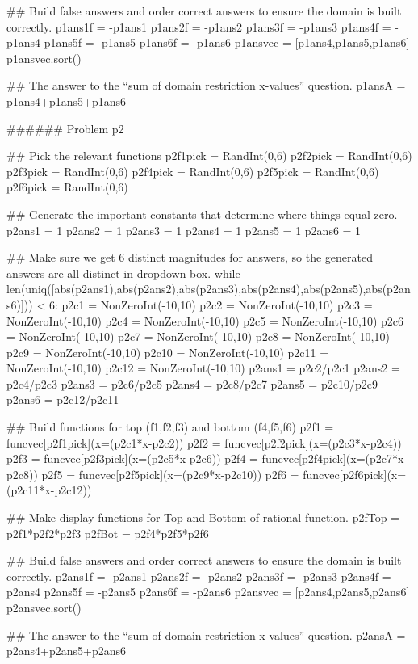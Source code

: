 \documentclass{ximera}
\begin{document}
\begin{sagesilent}
## Build false answers and order correct answers to ensure the domain is built correctly.
p1ans1f = -p1ans1
p1ans2f = -p1ans2
p1ans3f = -p1ans3
p1ans4f = -p1ans4
p1ans5f = -p1ans5
p1ans6f = -p1ans6
p1ansvec = [p1ans4,p1ans5,p1ans6]
p1ansvec.sort()

## The answer to the ``sum of domain restriction x-values'' question.
p1ansA = p1ans4+p1ans5+p1ans6



###### Problem p2

## Pick the relevant functions
p2f1pick = RandInt(0,6)
p2f2pick = RandInt(0,6)
p2f3pick = RandInt(0,6)
p2f4pick = RandInt(0,6)
p2f5pick = RandInt(0,6)
p2f6pick = RandInt(0,6)

## Generate the important constants that determine where things equal zero.
p2ans1 = 1
p2ans2 = 1
p2ans3 = 1
p2ans4 = 1
p2ans5 = 1
p2ans6 = 1

## Make sure we get 6 distinct magnitudes for answers, so the generated answers are all distinct in dropdown box.
while len(uniq([abs(p2ans1),abs(p2ans2),abs(p2ans3),abs(p2ans4),abs(p2ans5),abs(p2ans6)])) < 6:
    p2c1 = NonZeroInt(-10,10)
    p2c2 = NonZeroInt(-10,10)
    p2c3 = NonZeroInt(-10,10)
    p2c4 = NonZeroInt(-10,10)
    p2c5 = NonZeroInt(-10,10)
    p2c6 = NonZeroInt(-10,10)
    p2c7 = NonZeroInt(-10,10)
    p2c8 = NonZeroInt(-10,10)
    p2c9 = NonZeroInt(-10,10)
    p2c10 = NonZeroInt(-10,10)
    p2c11 = NonZeroInt(-10,10)
    p2c12 = NonZeroInt(-10,10)
    p2ans1 = p2c2/p2c1
    p2ans2 = p2c4/p2c3
    p2ans3 = p2c6/p2c5
    p2ans4 = p2c8/p2c7
    p2ans5 = p2c10/p2c9
    p2ans6 = p2c12/p2c11

## Build functions for top (f1,f2,f3) and bottom (f4,f5,f6)
p2f1 = funcvec[p2f1pick](x=(p2c1*x-p2c2))
p2f2 = funcvec[p2f2pick](x=(p2c3*x-p2c4))
p2f3 = funcvec[p2f3pick](x=(p2c5*x-p2c6))
p2f4 = funcvec[p2f4pick](x=(p2c7*x-p2c8))
p2f5 = funcvec[p2f5pick](x=(p2c9*x-p2c10))
p2f6 = funcvec[p2f6pick](x=(p2c11*x-p2c12))

## Make display functions for Top and Bottom of rational function.
p2fTop = p2f1*p2f2*p2f3
p2fBot = p2f4*p2f5*p2f6

## Build false answers and order correct answers to ensure the domain is built correctly.
p2ans1f = -p2ans1
p2ans2f = -p2ans2
p2ans3f = -p2ans3
p2ans4f = -p2ans4
p2ans5f = -p2ans5
p2ans6f = -p2ans6
p2ansvec = [p2ans4,p2ans5,p2ans6]
p2ansvec.sort()

## The answer to the ``sum of domain restriction x-values'' question.
p2ansA = p2ans4+p2ans5+p2ans6




\end{sagesilent}
\end{document}
